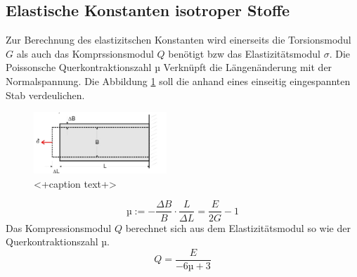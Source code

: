\subsection{Elastische Konstanten isotroper Stoffe}
Zur Berechnung des elastizitschen Konstanten wird einerseits die Torsionsmodul $G$ als auch das Komprssionsmodul $Q$ benötigt bzw das Elastizitätsmodul $\sigma$.
Die Poissonsche Querkontraktionszahl µ Verknüpft die Längenänderung mit der Normalspannung. Die Abbildung \ref{fig:poisson} soll die anhand eines einseitig eingespannten Stab verdeulichen.
\begin{figure}
  \centering
  \includegraphics[width=5.0cm]{./picture/poisson.png}
  \caption{<+caption text+>}
  \label{fig:poisson}
\end{figure}
\begin{equation}
  \text{µ} := -\frac{\Delta B}{B} \cdot \frac{L}{\Delta L} = \frac{E}{2G} - 1
  \label{eqn:pois}
\end{equation}
Das Kompressionsmodul $Q$ berechnet sich aus dem Elastizitätsmodul so wie der Querkontraktionszahl µ.
\begin{equation}
  Q = \frac{E}{-6µ + 3}
  \label{}
\end{equation}

